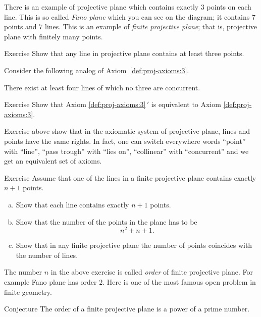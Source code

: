 There is an example of projective plane which contains exactly 3 points on each line.
This is so called \emph{Fano plane} which you can see on the diagram;
it contains $7$ points and $7$ lines.
This is an example of \emph{finite projective plane};
that is, projective plane with finitely many points.

\begin{thm}{Exercise}\label{ex:finite-pp}
Show that any line in projective plane contains at least three points.
\end{thm}

Consider the following analog of Axiom~\ref{def:proj-axioms:3}.

\medskip

There exist at least four lines of which no three are concurrent.

\begin{thm}{Exercise}\label{ex:3=3'}
Show that Axiom \ref{def:proj-axioms:3}$\,'$ is equivalent to Axiom \ref{def:proj-axioms:3}.
\end{thm}

Exercise above show that in the axiomatic system of projective plane,
lines and points have the same rights.
In fact, one can switch everywhere words ``point'' with ``line'', ``pass trough'' with ``lies on'', ``collinear'' with ``concurrent'' and we get an equivalent set of axioms.

\begin{thm}{Exercise}\label{ex:oder}
Assume that one of the lines in a finite projective plane contains exactly $n+1$ points.
\begin{enumerate}[(a)]
\item\label{ex:oder:a} Show that each line contains exactly $n+1$ points.
\item\label{ex:oder:b} Show that the number of the points in the plane has to be 
\[n^2+n+1.\]
\item\label{ex:oder:c} Show that in any finite projective plane the number of points coincides with the number of lines.
\end{enumerate}
\end{thm}

The number $n$ in the above exercise is called \emph{order} of finite projective plane.
For example Fano plane has order $2$.
Here is one of the most famous open problem in finite geometry.

\begin{thm}{Conjecture}
The order of a finite projective plane is a power of a prime number.
\end{thm}


